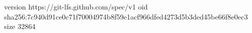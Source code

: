 version https://git-lfs.github.com/spec/v1
oid sha256:7c940d91ce0c71f70004974b8f59e1acf966dfed4273d5b3ded45be66f8e0ec3
size 32864

